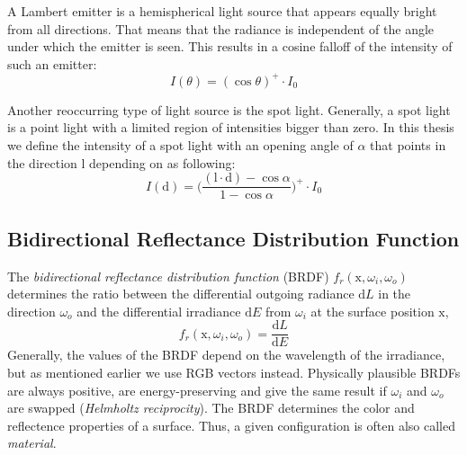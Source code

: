 \documentclass[thesis.tex]{subfiles}
\begin{document}
A Lambert emitter is a hemispherical light source that appears equally bright from all directions.
That means that the radiance is independent of the angle under which the emitter is seen.
This results in a cosine falloff of the intensity of such an emitter:
\begin{equation}
I(\theta) = (\cos\theta)^+ \cdot I_0
\end{equation}

Another reoccurring type of light source is the spot light.
Generally, a spot light is a point light with a limited region of intensities bigger than zero.
In this thesis we define the intensity of a spot light with an opening angle of $\alpha$ that points in the direction $\mathrm{l}$ depending on as following:
\begin{equation}
I(\mathrm{d}) = \Big(\frac{(\mathrm{l} \cdot \mathrm{d}) - \cos\alpha }{1-\cos\alpha}\Big)^+ \cdot I_0
\end{equation}

\subsection{Bidirectional Reflectance Distribution Function}\label{sec:preq:brdf}
The \emph{bidirectional reflectance distribution function} (BRDF) $f_r(\mathrm{x}, \omega_i, \omega_o)$ determines the ratio between the differential outgoing radiance $\mathrm{d}L$ in the direction $\omega_o$ and the differential irradiance $\mathrm{d}E$ from $\omega_i$ at the surface position $\mathrm{x}$,
\begin{equation}
f_r(\mathrm{x}, \omega_i, \omega_o) = \frac{\mathrm{d}L}{\mathrm{d}E}
\end{equation}
Generally, the values of the BRDF depend on the wavelength of the irradiance, but as mentioned earlier we use RGB vectors instead.
Physically plausible BRDFs are always positive, are energy-preserving and give the same result if $\omega_i$ and $\omega_o$ are swapped (\emph{Helmholtz reciprocity}).
The BRDF determines the color and reflectence properties of a surface.
Thus, a given configuration is often also called \emph{material}.
\end{document}
